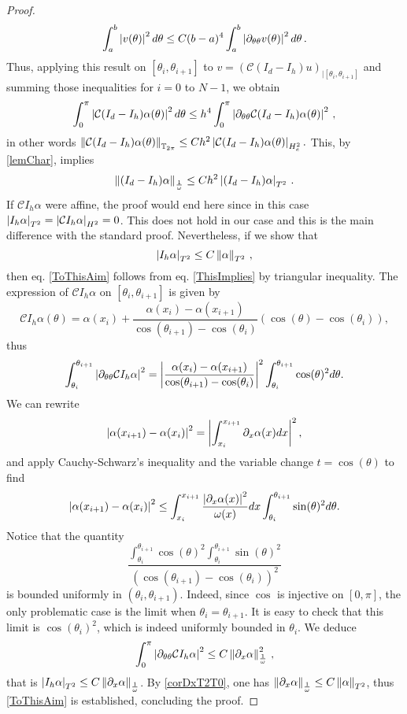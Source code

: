 \documentclass[a4paper]{article}
\begin{document}
\begin{proof}
\begin{equation}
	\int_{a}^b \left\lvert v(\theta) \right\rvert^2d\theta \leq C (b-a)^4\int_{a}^b \left\lvert \partial_{\theta \theta} v(\theta) \right\rvert^2 d\theta\,.
	\label{H2nulleaubord}
\end{equation}
	Thus, applying this result on $[\theta_i,\theta_{i+1}]$ to $v = (\mathcal{C}(I_d - I_h)u)_{|[\theta_i,\theta_{i+1}]}$ and summing those inequalities for $i = 0$ to $N-1$, we obtain
	\[\int_{0}^{\pi} \left\lvert \mathcal{C}(I_d - I_h)\alpha(\theta) \right\rvert^2 d\theta \leq h^4\int_{0}^{\pi} \left\lvert \partial_{\theta\theta}\mathcal{C}(I_d - I_h)\alpha(\theta)  \right\rvert^2\,,\]
	in other words $\left\|\mathcal{C}(I_d - I_h)\alpha(\theta)\right\|_{\mathbb{T}_{2\pi}} \leq Ch^2 \left\lvert \mathcal{C}(I_d - I_h)\alpha(\theta) \right\rvert_{H^2_e}.$
	This, by \autoref{lemChar}, implies 
	\begin{equation}
		\left\|(I_d - I_h)\alpha\right\|_{\frac{1}{\omega}} \leq Ch^2 \left\lvert (I_d - I_h)\alpha \right\rvert_{T^2}\,.
		\label{ThisImplies}
	\end{equation}
	If $\mathcal{C}I_h \alpha$ were affine, the proof would end here since in this case $\left\lvert I_h \alpha \right\rvert_{T^2} = \left\lvert \mathcal{C}I_h \alpha \right\rvert_{H^2} = 0$. This does not hold in our case and this is the main difference with the standard proof. Nevertheless, if we show that 
	\[\left\lvert I_h \alpha \right\rvert_{T^2} \leq C \left\|\alpha\right\|_{T^2}\,,\]
 	then eq. \eqref{ToThisAim} follows from eq. \eqref{ThisImplies} by triangular inequality. The expression of $\mathcal{C}I_h \alpha$ on $[\theta_{i},\theta_{i+1}]$ is given by 
	\[\mathcal{C}{I_h \alpha}(\theta) = \alpha(x_i) + \frac{\alpha(x_i) - \alpha(x_{i+1})}{\cos(\theta_{i+1}) - \cos(\theta_i)} (\cos(\theta) - \cos(\theta_i)),\]
	thus
	\[\int_{\theta_i}^{\theta_{i+1}} \left\lvert \partial_{\theta\theta}\mathcal{C}{I_h\alpha} \right\rvert^2 = \left\lvert \frac{\alpha(x_i) - \alpha(x_{i+1})}{\cos(\theta_{i+1}) - \cos(\theta_i)} \right\rvert^2 \int_{\theta_i}^{\theta_{i+1}} \cos(\theta)^2 d\theta.\]
	We can rewrite 
	\[\left\lvert \alpha(x_{i+1}) - \alpha(x_i) \right\rvert^2 = \left\lvert  \int_{x_i}^{x_{i+1}} \partial_x\alpha(x)dx \right\rvert^2,\]
	and apply Cauchy-Schwarz's inequality and the variable change $t = \cos(\theta)$ to find 
	\[\left\lvert \alpha(x_{i+1}) - \alpha(x_i) \right\rvert^2 \leq \int_{x_i}^{x_{i+1}} \frac{\left\lvert \partial_x \alpha(x) \right\rvert^2}{\omega(x)} dx\int_{\theta_i}^{\theta_{i+1}} \sin(\theta)^2 d\theta.\]
	Notice that the quantity
	\[\frac{ \int_{\theta_i}^{\theta_{i+1}} \cos(\theta)^2\int_{\theta_i}^{\theta_{i+1}} \sin(\theta)^2}{(\cos(\theta_{i+1}) - \cos(\theta_i))^2}\]
	is bounded uniformly in $(\theta_i, \theta_{i+1})$. Indeed, since $\cos$ is injective on $[0,\pi]$, the only problematic case is the limit when $\theta_i = \theta_{i+1}$. It is easy to check that this limit is $\cos(\theta_i)^2$, which is indeed uniformly bounded in $\theta_i$. We deduce 
	\[ \int_{0}^{\pi} \left\lvert \partial_{\theta\theta}\mathcal{C}{I_h\alpha} \right\rvert^2 \leq C \left\|\partial_x \alpha\right\|^2_\frac{1}{\omega}\,,\]
	that is $\left\lvert I_h \alpha \right\rvert_{T^2} \leq C \left\|\partial_x \alpha\right\|_{\frac{1}{\omega}}$. By \autoref{corDxT2T0}, one has $\left\|\partial_x \alpha\right\|_{\frac{1}{\omega}} \leq C \left\|\alpha\right\|_{T^2}$, thus \eqref{ToThisAim} is established, concluding the proof.	
	\end{proof} 
\end{document}
